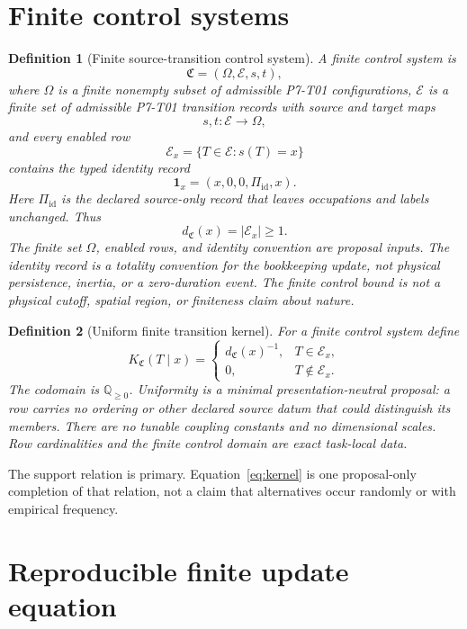 \documentclass[11pt]{article}
\newtheorem{definition}{Definition}
\newcommand{\Control}{\mathfrak C}
\newcommand{\Enabled}{\mathcal E}
\newcommand{\Kernel}{K_{\Control}}
\begin{document}
\section{Finite control systems}

\begin{definition}[Finite source-transition control system]
A finite control system is
\[
  \Control=(\Omega,\Enabled,s,t),
\]
where \(\Omega\) is a finite nonempty subset of admissible P7-T01
configurations, \(\Enabled\) is a finite set of admissible P7-T01 transition
records with source and target maps
\[
  s,t:\Enabled\longrightarrow\Omega,
\]
and every enabled row
\[
  \Enabled_x=\{T\in\Enabled:s(T)=x\}
\]
contains the typed identity record
\[
  \mathbf 1_x=(x,0,0,\Pi_{\mathrm{id}},x).
\]
Here \(\Pi_{\mathrm{id}}\) is the declared source-only record that leaves
occupations and labels unchanged. Thus
\[
  d_{\Control}(x)=|\Enabled_x|\geq 1.
\]
The finite set \(\Omega\), enabled rows, and identity convention are
proposal inputs. The identity record is a totality convention for the
bookkeeping update, not physical persistence, inertia, or a zero-duration
event. The finite control bound is not a physical cutoff, spatial region, or
finiteness claim about nature.
\end{definition}

\begin{definition}[Uniform finite transition kernel]
For a finite control system define
\begin{equation}
  \Kernel(T\mid x)=
  \begin{cases}
    d_{\Control}(x)^{-1},&T\in\Enabled_x,\\
    0,&T\notin\Enabled_x.
  \end{cases}
  \label{eq:kernel}
\end{equation}
The codomain is \(\mathbb Q_{\geq0}\). Uniformity is a minimal
presentation-neutral proposal: a row carries no ordering or other declared
source datum that could distinguish its members. There are no tunable
coupling constants and no dimensional scales. Row cardinalities and the
finite control domain are exact task-local data.
\end{definition}

The support relation is primary. Equation~\eqref{eq:kernel} is one
proposal-only completion of that relation, not a claim that alternatives
occur randomly or with empirical frequency.

\section{Reproducible finite update equation}
\end{document}
